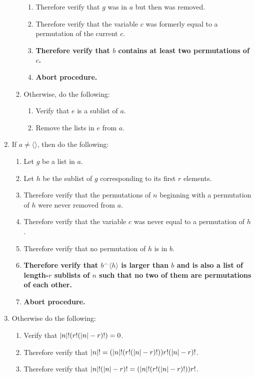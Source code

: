 \documentclass{article}
\let\div\relax\DeclareMathOperator{\div}{div}
\let\mod\relax\DeclareMathOperator{\mod}{mod}
\newcounter{procedure}[part]
\begin{document}
\begin{multicols}{2}
\begin{enumerate}
\begin{enumerate}
\begin{enumerate}
							\item Therefore verify that $g$ was in $a$ but then was removed.
							\item Therefore verify that the variable $c$ was formerly equal to a permutation of the current $c$.
							\item \textbf{Therefore verify that $b$ contains at least two permutations of $c$.}
							\item \textbf{Abort procedure.}
						\end{enumerate}
						\item Otherwise, do the following:
						\begin{enumerate}
							\item Verify that $e$ is a sublist of $a$.
							\item Remove the lists in $e$ from $a$.
						\end{enumerate}
					\end{enumerate}
					\item If $a\ne\langle\rangle$, then do the following:
					\begin{enumerate}
						\item Let $g$ be a list in $a$.
						\item Let $h$ be the sublist of $g$ corresponding to its first $r$ elements.
						\item Therefore verify that the permutations of $n$ beginning with a permutation of $h$ were never removed from $a$.
						\item Therefore verify that the variable $c$ was never equal to a permutation of $h$.
						\item Therefore verify that no permutation of $h$ is in $b$.
						\item \textbf{Therefore verify that $b^{\frown}\langle h\rangle$ is larger than $b$ and is also a list of length-$r$ sublists of $n$ such that no two of them are permutations of each other.}
						\item \textbf{Abort procedure.}
					\end{enumerate}
					\item Otherwise do the following:
					\begin{enumerate}
						\item Verify that $\lvert n\rvert!\mod(r!(\lvert n\rvert-r)!)=0$.
						\item Therefore verify that $\lvert n\rvert!=(\lvert n\rvert!\div(r!(\lvert n\rvert-r)!))r!(\lvert n\rvert-r)!$.
						\item Therefore verify that $\lvert n\rvert!\div(\lvert n\rvert-r)!=(\lvert n\rvert!\div(r!(\lvert n\rvert-r)!))r!$.

\end{enumerate}
\end{enumerate}
\end{multicols}
\end{document}
